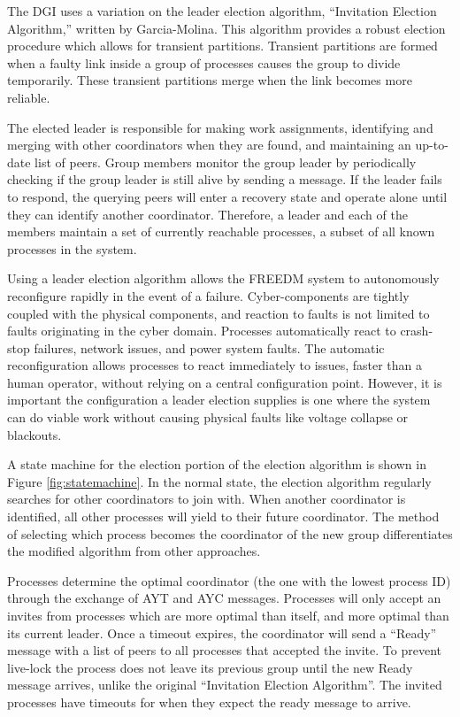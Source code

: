 The \ac{DGI} uses a variation on the leader election algorithm, ``Invitation Election Algorithm,'' written by Garcia-Molina\cite{INVITATIONELECTION}.
This algorithm provides a robust election procedure which allows for transient partitions.
Transient partitions are formed when a faulty link inside a group of processes causes the group to divide temporarily.
These transient partitions merge when the link becomes more reliable.

The elected leader is responsible for making work assignments, identifying and merging with other coordinators when they are found, and maintaining an up-to-date list of peers.
Group members monitor the group leader by periodically checking if the group leader is still alive by sending a message.
If the leader fails to respond, the querying peers will enter a recovery state and operate alone until they can identify another coordinator.
Therefore, a leader and each of the members maintain a set of currently reachable processes, a subset of all known processes in the system.

Using a leader election algorithm allows the \ac{FREEDM} system to autonomously reconfigure rapidly in the event of a failure.
Cyber-components are tightly coupled with the physical components, and reaction to faults is not limited to faults originating in the cyber domain.
Processes automatically react to crash-stop failures, network issues, and power system faults.
The automatic reconfiguration allows processes to react immediately to issues, faster than a human operator, without relying on a central configuration point.
However, it is important the configuration a leader election supplies is one where the system can do viable work without causing physical faults like voltage collapse or blackouts\cite{HARINI}.

A state machine for the election portion of the election algorithm is shown in Figure \ref{fig:statemachine}.
In the normal state, the election algorithm regularly searches for other coordinators to join with.
When another coordinator is identified, all other processes will yield to their future coordinator.
The method of selecting which process becomes the coordinator of the new group differentiates the modified algorithm from other approaches.

Processes determine the optimal coordinator (the one with the lowest process ID) through the exchange of \ac{AYT} and \ac{AYC} messages.
Processes will only accept an invites from processes which are more optimal than itself, and more optimal than its current leader.
Once a timeout expires, the coordinator will send a ``Ready'' message with a list of peers to all processes that accepted the invite.
To prevent live-lock the process does not leave its previous group until the new Ready message arrives, unlike the original ``Invitation Election Algorithm''.
The invited processes have timeouts for when they expect the ready message to arrive.


